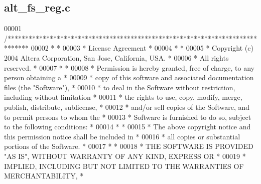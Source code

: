 \subsection{alt\+\_\+fs\+\_\+reg.\+c}
\label{alt__fs__reg_8c_source}

\begin{DoxyCode}
00001 \textcolor{comment}{/******************************************************************************}
00002 \textcolor{comment}{*                                                                             *}
00003 \textcolor{comment}{* License Agreement                                                           *}
00004 \textcolor{comment}{*                                                                             *}
00005 \textcolor{comment}{* Copyright (c) 2004 Altera Corporation, San Jose, California, USA.           *}
00006 \textcolor{comment}{* All rights reserved.                                                        *}
00007 \textcolor{comment}{*                                                                             *}
00008 \textcolor{comment}{* Permission is hereby granted, free of charge, to any person obtaining a     *}
00009 \textcolor{comment}{* copy of this software and associated documentation files (the "Software"),  *}
00010 \textcolor{comment}{* to deal in the Software without restriction, including without limitation   *}
00011 \textcolor{comment}{* the rights to use, copy, modify, merge, publish, distribute, sublicense,    *}
00012 \textcolor{comment}{* and/or sell copies of the Software, and to permit persons to whom the       *}
00013 \textcolor{comment}{* Software is furnished to do so, subject to the following conditions:        *}
00014 \textcolor{comment}{*                                                                             *}
00015 \textcolor{comment}{* The above copyright notice and this permission notice shall be included in  *}
00016 \textcolor{comment}{* all copies or substantial portions of the Software.                         *}
00017 \textcolor{comment}{*                                                                             *}
00018 \textcolor{comment}{* THE SOFTWARE IS PROVIDED "AS IS", WITHOUT WARRANTY OF ANY KIND, EXPRESS OR  *}
00019 \textcolor{comment}{* IMPLIED, INCLUDING BUT NOT LIMITED TO THE WARRANTIES OF MERCHANTABILITY,    *}

\end{DoxyCode}
